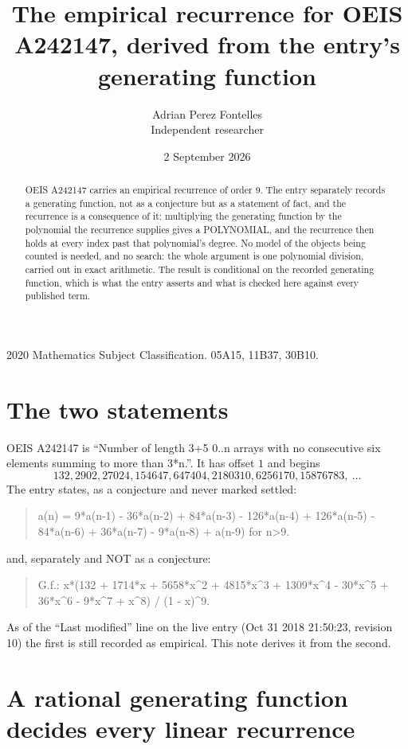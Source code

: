 \documentclass[11pt,a4paper]{article}
\title{The empirical recurrence for OEIS A242147, derived from the entry's generating function}
\author{Adrian Perez Fontelles\\ \small Independent researcher}
\date{2 September 2026}
\theoremstyle{plain}
\theoremstyle{definition}
\begin{document}
\maketitle

\begin{abstract}
OEIS A242147 carries an empirical recurrence of order $9$. The entry separately records a
generating function, not as a conjecture but as a statement of fact, and the recurrence is a
consequence of it: multiplying the generating function by the polynomial the recurrence
supplies gives a POLYNOMIAL, and the recurrence then holds at every index past that
polynomial's degree. No model of the objects being counted is needed, and no search: the
whole argument is one polynomial division, carried out in exact arithmetic. The result is
conditional on the recorded generating function, which is what the entry asserts and what is
checked here against every published term.
\end{abstract}

\noindent\small 2020 Mathematics Subject Classification. 05A15, 11B37, 30B10.\normalsize

\section{The two statements}

OEIS A242147 is ``Number of length 3+5 0..n arrays with no consecutive six elements summing to more than 3*n.''. It has offset $1$ and begins
\[
132, 2902, 27024, 154647, 647404, 2180310, 6256170, 15876783,\ \dots
\]
The entry states, as a conjecture and never marked settled:
\begin{quote}
a(n) = 9*a(n-1) - 36*a(n-2) + 84*a(n-3) - 126*a(n-4) + 126*a(n-5) - 84*a(n-6) + 36*a(n-7) - 9*a(n-8) + a(n-9) for n>9.
\end{quote}
and, separately and NOT as a conjecture:
\begin{quote}
G.f.: x*(132 + 1714*x + 5658*x\^{}2 + 4815*x\^{}3 + 1309*x\^{}4 - 30*x\^{}5 + 36*x\^{}6 - 9*x\^{}7 + x\^{}8) / (1 - x)\^{}9.
\end{quote}
As of the ``Last modified'' line on the live entry (Oct 31 2018 21:50:23, revision 10) the first is still
recorded as empirical. This note derives it from the second.

\section{A rational generating function decides every linear recurrence}
\end{document}
